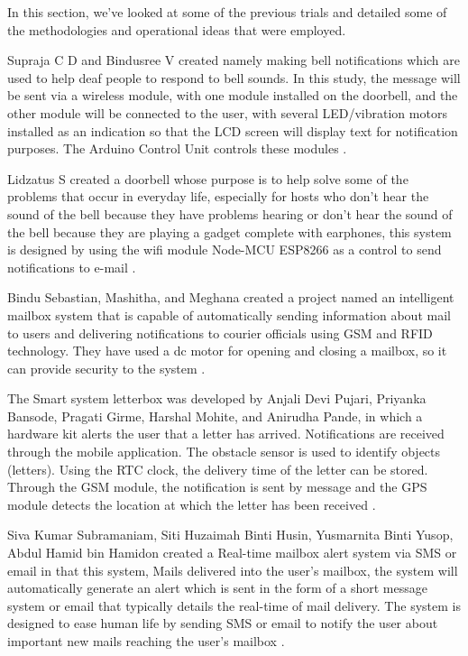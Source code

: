 \label{chapter: State of Art}

In this section, we've looked at some of the previous trials and detailed some of the methodologies and operational ideas that were employed.

Supraja C D and Bindusree V created namely making bell notifications which are used to help deaf people to respond to bell sounds. In this study, the message will be sent via a wireless module, with one module installed on the doorbell, and the other module will be connected to the user, with several LED/vibration motors installed as an indication so that the LCD screen will display text for notification purposes. The Arduino Control Unit controls these modules \cite{devi2019}.

Lidzatus S created a doorbell whose purpose is to help solve some of the problems that occur in everyday life, especially for hosts who don't hear the sound of the bell because they have problems hearing or don't hear the sound of the bell because they are playing a gadget complete with earphones, this system is designed by using the wifi module Node-MCU ESP8266 as a control to send notifications to e-mail \cite{setiawan2021}.

Bindu Sebastian, Mashitha, and Meghana created a project named an intelligent mailbox system that is capable of automatically sending information about mail to users and delivering notifications to courier officials using GSM and RFID technology. They have used a dc motor for opening and closing a mailbox, so it can provide security to the system \cite{Sebastian2016}.

The Smart system letterbox was developed by Anjali Devi Pujari, Priyanka Bansode, Pragati Girme, Harshal Mohite, and Anirudha Pande, in which a hardware kit alerts the user that a letter has arrived. Notifications are received through the mobile application. The obstacle sensor is used to identify objects (letters). Using the RTC clock, the delivery time of the letter can be stored. Through the GSM module, the notification is sent by message and the GPS module detects the location at which the letter has been received \cite{Bansode2016}.

Siva Kumar Subramaniam, Siti Huzaimah Binti Husin, Yusmarnita Binti Yusop, Abdul Hamid bin Hamidon created a Real-time mailbox alert system via SMS or email in that this system, Mails delivered into the user’s mailbox, the system will automatically generate an alert which is sent in the form of a short message system or email that typically details the real-time of mail delivery. The system is designed to ease human life by sending SMS or email to notify the user about important new mails reaching the user’s mailbox \cite{Subramaniam2007}.
